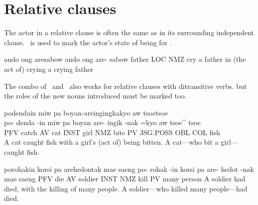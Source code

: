 \section{Relative clauses}
The actor in a relative clause is often the same as in its surrounding independent clause.
\LOC~is used to mark the actor's state of being for .
\begin{examples}
	\ex
	\label{ex:father_who_cried}
	\script ando ong aresabow
	\bits ando ong are- sabow
	\gloss father LOC NMZ cry
	\tr a father in (the act of) crying
	\tr a crying father
\end{examples}

The combo of \INST~and \NMZ~also works for relative clauses with ditransitive verbs.
but the roles of the new nouns introduced must be marked too.
\begin{examples}
	\ex
	\label{ex:cat_who_bit_girl}
	\script podendain miw pa boyan-areingingkakyo aw tsoetsoe \\
	\bits po- denda -in miw pa boyan are- ingik -nak =kyo aw tsoe^ tsoe \\
	\gloss PFV catch AV cat INST girl NMZ bite PV 3SG.POSS OBL COL fish \\
	\tr A cat caught fish with a girl's (act of) being bitten.
	\tr A cat---who bit a girl---caught fish.
\end{examples}

\begin{examples}
	\ex
	\label{ex:soldier_died}
	\script porohakin korsi pa arehedontak mae saeng
	\bits po- rohak -in korsi pa are- hedot -nak mae saeng
	\gloss PFV die AV soldier INST NMZ kill PV many person
	\tr A soldier had died, with the killing of many people.
	\tr A soldier---who killed many people---had died.
\end{examples}